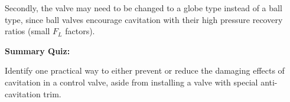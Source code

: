 Secondly, the valve may need to be changed to a globe type instead of a ball type, since ball valves encourage cavitation with their high pressure recovery ratios (small $F_{L}$ factors).

\vfil \eject

\noindent
{\bf Summary Quiz:}

Identify one practical way to either prevent or reduce the damaging effects of cavitation in a control valve, aside from installing a valve with special anti-cavitation trim.





